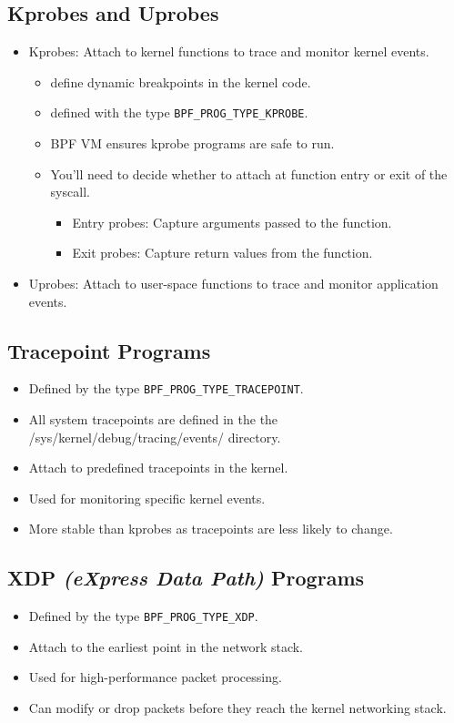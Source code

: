 \documentclass[a4paper,12pt]{article}
\begin{document}
\subsection{Kprobes and Uprobes}
\begin{itemize}
    \item Kprobes: Attach to kernel functions to trace and monitor kernel events.
    \begin{itemize}
        \item define dynamic breakpoints in the kernel code.
        \item defined with the type \texttt{BPF\_PROG\_TYPE\_KPROBE}.
        \item BPF VM ensures kprobe programs are safe to run.
        \item You'll need to decide whether to attach at function entry or exit of the syscall.
        \begin{itemize}
            \item Entry probes: Capture arguments passed to the function.
            \item Exit probes: Capture return values from the function.
        \end{itemize}
    \end{itemize}
    \item Uprobes: Attach to user-space functions to trace and monitor application events.
\end{itemize}

\subsection{Tracepoint Programs}
\begin{itemize}
    \item Defined by the type \texttt{BPF\_PROG\_TYPE\_TRACEPOINT}.
    \item All system tracepoints are defined in the the /sys/kernel/debug/tracing/events/ directory.
    \item Attach to predefined tracepoints in the kernel.
    \item Used for monitoring specific kernel events.
    \item More stable than kprobes as tracepoints are less likely to change.
\end{itemize}

\subsection{XDP \textsl{(eXpress Data Path)} Programs}
\begin{itemize}
    \item Defined by the type \texttt{BPF\_PROG\_TYPE\_XDP}.
    \item Attach to the earliest point in the network stack.
    \item Used for high-performance packet processing.
    \item Can modify or drop packets before they reach the kernel networking stack.
\end{itemize}
\end{document}
